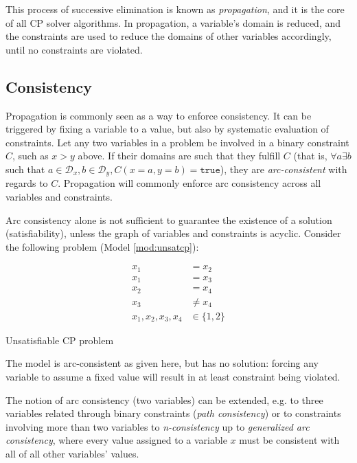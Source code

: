 \documentclass[13pt, letterpaper, oneside]{book}
\begin{document}
This process of successive elimination is known as
\textit{propagation}, and it is the core of all CP solver algorithms. In
propagation, a variable's domain is reduced, and the constraints are used
to reduce the domains of other variables accordingly, until no constraints are
violated.

\subsection{Consistency}
Propagation is commonly seen as a way to enforce consistency. It can be
triggered by fixing a variable to a value, but also by systematic evaluation of
constraints. Let any two variables in a problem be involved in a binary
constraint $C$, such as $x > y$ above. If their domains are such that
they fulfill $C$ (that is, $\forall a \exists b$ such that $a \in
\mathcal{D}_x, b \in \mathcal{D}_y, C(x = a, y = b) = \mathtt{true}$), they are
\textit{arc-consistent} with regards to $C$. Propagation will commonly enforce
arc consistency across all variables and constraints.
 
Arc consistency alone is not sufficient to guarantee the existence of a solution
(satisfiability), unless the graph of variables and constraints is acyclic.
Consider the following problem (Model \ref{mod:unsatcp}):
 
\begin{model}[h!]
\begin{align}
x_1 &= x_2\\
x_1 &= x_3\\
x_2 &= x_4\\
x_3 &\neq x_4\\
x_1, x_2, x_3, x_4 &\in \{1, 2\}
\end{align}
\caption{Unsatisfiable CP problem}
\label{mod:unsatcp}
\end{model}
The model is arc-consistent as given here, but has no solution: forcing any variable to assume
a fixed value will result in at least constraint being violated.
 
The notion of arc consistency (two variables) can be extended, e.g. to three
variables related through binary constraints (\textit{path consistency}) or
to constraints involving more than two variables to \textit{n-consistency} up to
\textit{generalized arc consistency}, where every value assigned to
a variable $x$ must be consistent with all of all other variables' values.
\end{document}
